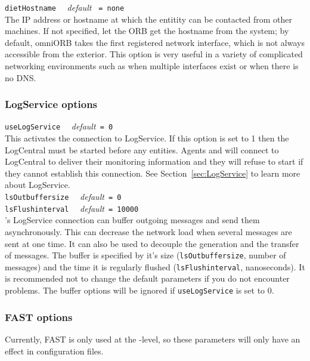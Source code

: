 \noindent
\texttt{dietHostname} \ \ \emph{default} \texttt{ = none }\\
The IP address or hostname at which the entitity can be contacted
from other machines. If not specified, let the
ORB get the hostname from the system; by default, omniORB takes the
first registered network interface, which is not always accessible
from the exterior.  This option is very useful in a variety of
complicated networking environments such as when multiple interfaces
exist or when there is no DNS.

\subsubsection{LogService options}

\noindent
\texttt{useLogService} \ \ \emph{default}\texttt{ = 0}\\ This
activates the connection to LogService. 
If
this option is set to 1 then the LogCentral must be started before any
\diet entities. Agents and \seds will connect to LogCentral to deliver
their monitoring information and they will refuse to start if they
cannot establish this connection. See Section~\ref{sec:LogService} 
to learn more about LogService.\\

\noindent
\texttt{lsOutbuffersize} \ \ \emph{default}\texttt{ = 0}\\
\noindent
\texttt{lsFlushinterval} \ \ \emph{default}\texttt{ = 10000}\\ \diet's
LogService connection can buffer outgoing messages and send them
asynchronously. This can decrease the network load when
several messages are sent at one time. It can also be used to decouple
the generation and the transfer of messages.  The buffer is specified
by it's size (\texttt{lsOutbuffersize}, number of messages) and the
time it is regularly flushed (\texttt{lsFlushinterval},
nanoseconds). It is recommended not to change the default parameters
if you do not encounter problems. The buffer options will be ignored
if \texttt{useLogService} is set to 0.


\subsubsection{FAST options}

\noindent
Currently, FAST is only used at the \sed-level, so these parameters
will only have an effect in \sed configuration files.\\


